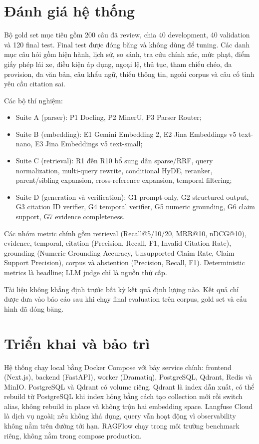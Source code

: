 \documentclass[12pt,a4paper]{article}
\begin{document}
\section{Đánh giá hệ thống}

Bộ gold set mục tiêu gồm 200 câu đã review, chia 40 development, 40 validation và 120 final test. Final test được đóng băng và không dùng để tuning. Các danh mục câu hỏi gồm hiện hành, lịch sử, so sánh, tra cứu chính xác, mức phạt, điểm giấy phép lái xe, điều kiện áp dụng, ngoại lệ, thủ tục, tham chiếu chéo, đa provision, đa văn bản, câu khẩu ngữ, thiếu thông tin, ngoài corpus và câu cố tình yêu cầu citation sai.

Các bộ thí nghiệm:

\begin{itemize}
  \item Suite A (parser): P1 Docling, P2 MinerU, P3 Parser Router;
  \item Suite B (embedding): E1 Gemini Embedding 2, E2 Jina Embeddings v5 text-nano, E3 Jina Embeddings v5 text-small;
  \item Suite C (retrieval): R1 đến R10 bổ sung dần sparse/RRF, query normalization, multi-query rewrite, conditional HyDE, reranker, parent/sibling expansion, cross-reference expansion, temporal filtering;
  \item Suite D (generation và verification): G1 prompt-only, G2 structured output, G3 citation ID verifier, G4 temporal verifier, G5 numeric grounding, G6 claim support, G7 evidence completeness.
\end{itemize}

Các nhóm metric chính gồm retrieval (Recall@5/10/20, MRR@10, nDCG@10), evidence, temporal, citation (Precision, Recall, F1, Invalid Citation Rate), grounding (Numeric Grounding Accuracy, Unsupported Claim Rate, Claim Support Precision), corpus và abstention (Precision, Recall, F1). Deterministic metrics là headline; LLM judge chỉ là nguồn thứ cấp.

Tài liệu không khẳng định trước bất kỳ kết quả định lượng nào. Kết quả chỉ được đưa vào báo cáo sau khi chạy final evaluation trên corpus, gold set và cấu hình đã đóng băng.

\section{Triển khai và bảo trì}

Hệ thống chạy local bằng Docker Compose với bảy service chính: frontend (Next.js), backend (FastAPI), worker (Dramatiq), PostgreSQL, Qdrant, Redis và MinIO. PostgreSQL và Qdrant có volume riêng. Qdrant là index dẫn xuất, có thể rebuild từ PostgreSQL khi index hỏng bằng cách tạo collection mới rồi switch alias, không rebuild in place và không trộn hai embedding space. Langfuse Cloud là dịch vụ ngoài; nếu không khả dụng, query vẫn hoạt động vì observability không nằm trên đường tới hạn. RAGFlow chạy trong môi trường benchmark riêng, không nằm trong compose production.
\end{document}
